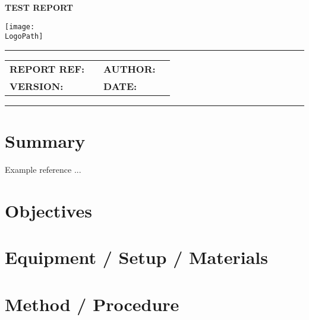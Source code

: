 \documentclass[10pt]{article}
\makeatletter
\newcommand{\customtitle}{%
  \noindent
  \begin{minipage}[t]{0.65\textwidth}
    \vspace{-0.5cm}
    {\ocrfamily\Large\bfseries TEST REPORT \par}
  \end{minipage}%
  \begin{minipage}[t]{0.35\textwidth}
    \flushright{}
    \texttt{[image: \\LogoPath]}
  \end{minipage}

  \vspace{0.3cm}
  \hrule height 0.8pt
  \vspace{0.3cm}

  {\ocrfamily\bfseries\ProjectFullRef\par}
  {\ocrfamily\large\bfseries\ReportTitle\par}

  \vspace{0.5em}

  \begin{tabular}{@{}ll@{\hspace{2cm}}ll@{}}
    \ocrfamily\textbf{REPORT REF:}   & \ocrfamily \ReportRef &
    \ocrfamily\textbf{AUTHOR:}    & \ocrfamily \AuthorName \\

    \ocrfamily\textbf{VERSION:} & \ocrfamily \DocVersion &
    \ocrfamily\textbf{DATE:}       & \ocrfamily \ReleaseDate \\
  \end{tabular}

  \vspace{0.3cm}
  \hrule height 0.8pt
  \vspace{0.25cm}
}
\makeatother
\begin{document}
\vspace*{-1cm}
\thispagestyle{plain}
\customtitle{}




\section{Summary}

Example reference \cite{hibbeler2016mechanics}...

\section{Objectives}

\section{Equipment / Setup / Materials} %

\section{Method / Procedure}
\end{document}
